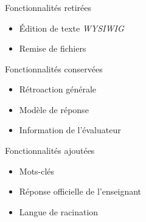 \documentclass{beamer}
\begin{document}
  \begin{frame}
    \frametitle{\insertsection}
    \begin{block}{Fonctionnalit\'es retir\'ees}
      \begin{itemize}
        \item \'Edition de texte \textit{WYSIWIG}
        \item Remise de fichiers
      \end{itemize}
    \end{block}
    
    \vfill
  
    \begin{block}{Fonctionnalit\'es conserv\'ees}
      \begin{itemize}
        \item R\'etroaction g\'en\'erale
        \item Mod\`ele de r\'eponse
        \item Information de l'\'evaluateur
      \end{itemize}
    \end{block}
    
    \vfill
  
    \begin{block}{Fonctionnalit\'es ajout\'ees}
      \begin{itemize}
        \item Mots-cl\'es
        \item R\'eponse officielle de l'enseignant
        \item Langue de racination
      \end{itemize}
    \end{block}
    \vfill
  \end{frame}
  
\end{document}
